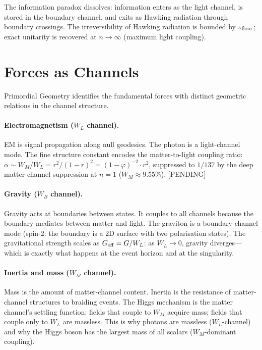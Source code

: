 \documentclass[prd,twocolumn,preprintnumbers,amsmath,amssymb]{revtex4-2}
\newcommand{\pending}{\textcolor{red!70!black}{[PENDING]}}
\newcommand{\phig}{\varphi}
\newcommand{\WL}{W_{L}}
\newcommand{\WB}{W_{B}}
\newcommand{\WM}{W_{M}}
\begin{document}
The information paradox dissolves: information enters as the light channel,
is stored in the boundary channel, and exits as Hawking radiation through
boundary crossings.  The irreversibility of Hawking radiation is bounded by
$\varepsilon_{\rm floor}$; exact unitarity is recovered at $n\to\infty$ (maximum
light coupling).

\section{Forces as Channels}
\label{sec:forces}

Primordial Geometry identifies the fundamental forces with distinct geometric
relations in the channel structure.

\paragraph{Electromagnetism ($\WL$ channel).}
EM is signal propagation along null geodesics.  The photon is a light-channel
mode.  The fine structure constant encodes the matter-to-light coupling ratio:
$\alpha \sim \WM/\WL = r^2/(1-r)^2 = (1-\phig)^{-2} \cdot r^2$, suppressed
to $1/137$ by the deep matter-channel suppression at $n=1$ ($\WM\approx
9.55\%$).  \pending

\paragraph{Gravity ($\WB$ channel).}
Gravity acts at boundaries between states.  It couples to all channels because
the boundary mediates between matter and light.  The graviton is a
boundary-channel mode (spin-2: the boundary is a 2D surface with two
polarisation states).  The gravitational strength scales as $G_{\rm eff} =
G/\WL$: as $\WL\to0$, gravity diverges---which is exactly what happens at the
event horizon and at the singularity.

\paragraph{Inertia and mass ($\WM$ channel).}
Mass is the amount of matter-channel content.  Inertia is the resistance of
matter-channel structures to braiding events.  The Higgs mechanism is the
matter channel's settling function: fields that couple to $\WM$ acquire mass;
fields that couple only to $\WL$ are massless.  This is why photons are
massless ($\WL$-channel) and why the Higgs boson has the largest mass of all
scalars ($\WM$-dominant coupling).
\end{document}
